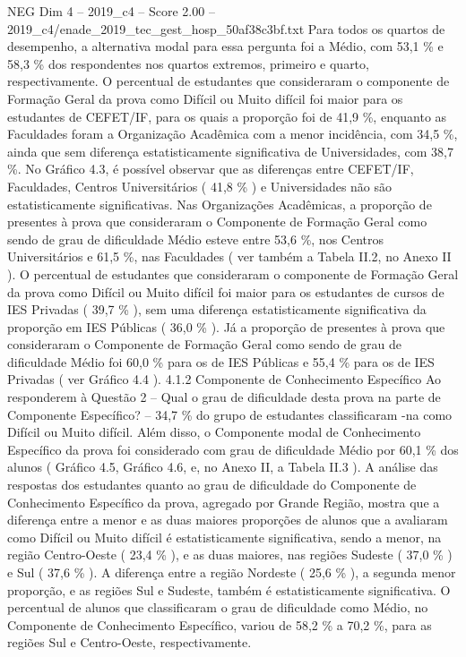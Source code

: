 \begin{textsample}{NEG Dim 4 – 2019\_c4 – Score 2.00 – 2019\_c4/enade\_2019\_tec\_gest\_hosp\_50af38c3bf.txt}
Para todos os quartos de desempenho, a alternativa modal para essa pergunta foi a Médio, com 53,1 \% e 58,3 \% dos respondentes nos quartos extremos, primeiro e quarto, respectivamente.
O percentual de estudantes que consideraram o componente de Formação Geral da prova como Difícil ou Muito difícil foi maior para os estudantes de CEFET/IF, para os quais a proporção foi de 41,9 \%, enquanto as Faculdades foram a Organização Acadêmica com a menor incidência, com 34,5 \%, ainda que sem diferença estatisticamente significativa de Universidades, com 38,7 \%.
No Gráfico 4.3, é possível observar que as diferenças entre CEFET/IF, Faculdades, Centros Universitários ( 41,8 \% ) e Universidades não são estatisticamente significativas.
Nas Organizações Acadêmicas, a proporção de presentes à prova que consideraram o Componente de Formação Geral como sendo de grau de dificuldade Médio esteve entre 53,6 \%, nos Centros Universitários e 61,5 \%, nas Faculdades ( ver também a Tabela II.2, no Anexo II ).
O percentual de estudantes que consideraram o componente de Formação Geral da prova como Difícil ou Muito difícil foi maior para os estudantes de cursos de IES Privadas ( 39,7 \% ), sem uma diferença estatisticamente significativa da proporção em IES Públicas ( 36,0 \% ).
Já a proporção de presentes à prova que consideraram o Componente de Formação Geral como sendo de grau de dificuldade Médio foi 60,0 \% para os de IES Públicas e 55,4 \% para os de IES Privadas ( ver Gráfico 4.4 ). 4.1.2 Componente de Conhecimento Específico Ao responderem à Questão 2 – Qual o grau de dificuldade desta prova na parte de Componente Específico? – 34,7 \% do grupo de estudantes classificaram -na como Difícil ou Muito difícil.
Além disso, o Componente modal de Conhecimento Específico da prova foi considerado com grau de dificuldade Médio por 60,1 \% dos alunos ( Gráfico 4.5, Gráfico 4.6, e, no Anexo II, a Tabela II.3 ).
A análise das respostas dos estudantes quanto ao grau de dificuldade do Componente de Conhecimento Específico da prova, agregado por Grande Região, mostra que a diferença entre a menor e as duas maiores proporções de alunos que a avaliaram como Difícil ou Muito difícil é estatisticamente significativa, sendo a menor, na região Centro-Oeste ( 23,4 \% ), e as duas maiores, nas regiões Sudeste ( 37,0 \% ) e Sul ( 37,6 \% ).
A diferença entre a região Nordeste ( 25,6 \% ), a segunda menor proporção, e as regiões Sul e Sudeste, também é estatisticamente significativa.
O percentual de alunos que classificaram o grau de dificuldade como Médio, no Componente de Conhecimento Específico, variou de 58,2 \% a 70,2 \%, para as regiões Sul e Centro-Oeste, respectivamente.

\end{textsample}
